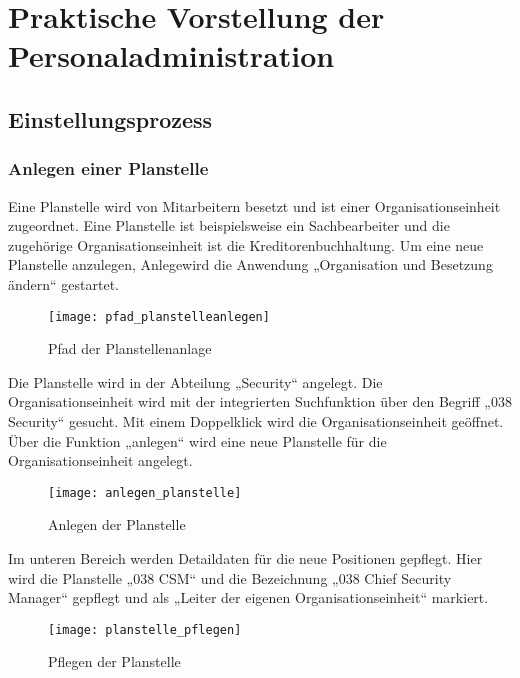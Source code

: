 

\section{Praktische Vorstellung der Personaladministration}
\label{sec:praktischevorstellungderpersonaladministration}

\subsection{Einstellungsprozess}
\subsubsection{Anlegen einer Planstelle}
Eine Planstelle wird von Mitarbeitern besetzt und ist einer Organisationseinheit zugeordnet. Eine Planstelle ist beispielsweise ein Sachbearbeiter und die zugehörige Organisationseinheit ist die Kreditorenbuchhaltung. Um eine neue Planstelle anzulegen, Anlegewird die Anwendung „Organisation und Besetzung ändern“ gestartet.

\begin{figure}[H]
	\centering
	\texttt{[image: pfad\_planstelleanlegen]}
	\caption{Pfad der Planstellenanlage}
	\label{fig:pfad_planstelleanlegen}
\end{figure}

Die Planstelle wird in der Abteilung „Security“ angelegt. Die Organisationseinheit wird mit der integrierten Suchfunktion über den Begriff „038 Security“ gesucht. Mit einem Doppelklick wird die Organisationseinheit geöffnet. Über die Funktion „anlegen“ wird eine neue Planstelle für die Organisationseinheit angelegt.

\begin{figure}[H]
	\centering
	\texttt{[image: anlegen\_planstelle]}
	\caption{Anlegen der Planstelle}
	\label{fig:anlegen_planstelle}
\end{figure}

Im unteren Bereich werden Detaildaten für die neue Positionen gepflegt. Hier wird die Planstelle „038 CSM“ und die Bezeichnung „038 Chief Security Manager“ gepflegt und als „Leiter der eigenen Organisationseinheit“ markiert.

\begin{figure}[H]
	\centering
	\texttt{[image: planstelle\_pflegen]}
	\caption{Pflegen der Planstelle}
	\label{fig:planstelle_pflegen}
\end{figure}

